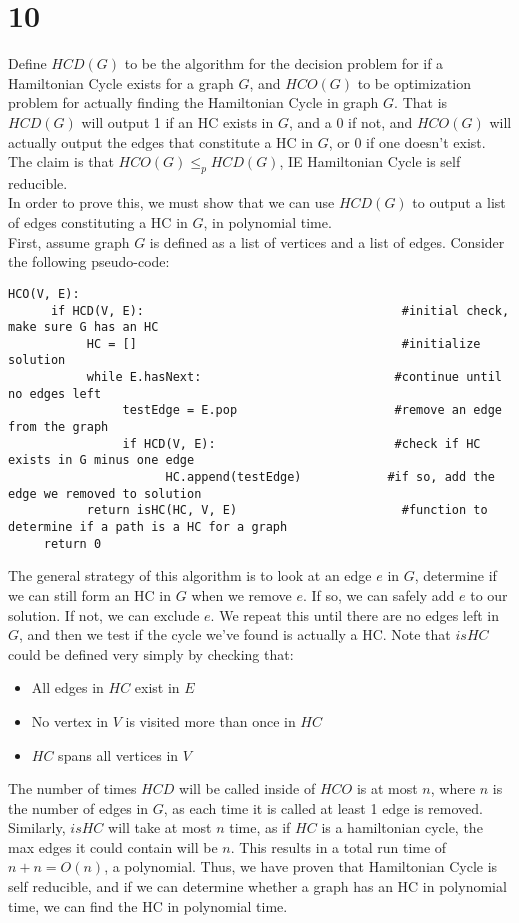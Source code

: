 \documentclass[letterpaper,notitlepage,twoside]{article}
\begin{document}
{\section*{10}
Define $HCD(G)$ to be the algorithm for the decision problem for if a Hamiltonian Cycle exists for a graph $G$, and $HCO(G)$ to be optimization problem for actually finding the Hamiltonian Cycle in graph $G$. That is $HCD(G)$ will output 1 if an HC exists in $G$, and a 0 if not, and $HCO(G)$ will actually output the edges that constitute a HC in $G$, or 0 if one doesn't exist. The claim is that $HCO(G) \leq_p HCD(G)$, IE Hamiltonian Cycle is self reducible. \\
In order to prove this, we must show that we can use $HCD(G)$ to output a list of edges constituting a HC in $G$, in polynomial time. \\
First, assume graph $G$ is defined as a list of vertices and a list of edges. Consider the following pseudo-code: 
\begin{verbatim}
HCO(V, E):
      if HCD(V, E):                                    #initial check, make sure G has an HC
           HC = []                                     #initialize solution 
           while E.hasNext:                           #continue until no edges left 
                testEdge = E.pop                      #remove an edge from the graph
                if HCD(V, E):                         #check if HC exists in G minus one edge
                      HC.append(testEdge)            #if so, add the edge we removed to solution
           return isHC(HC, V, E)                       #function to determine if a path is a HC for a graph
     return 0

\end{verbatim}
The general strategy of this algorithm is to look at an edge $e$ in $G$, determine if we can still form an HC in $G$ when we remove $e$. If so, we can safely add $e$ to our solution. If not, we can exclude $e$. We repeat this until there are no edges left in $G$, and then we test if the cycle we've found is actually a HC. Note that $isHC$ could be defined very simply by checking that:
\begin{itemize}
\item All edges in $HC$ exist in $E$
\item No vertex in $V$ is visited more than once in $HC$
\item $HC$ spans all vertices in $V$
\end{itemize}
The number of times $HCD$ will be called inside of $HCO$ is at most $n$, where $n$ is the number of edges in $G$, as each time it is called at least 1 edge is removed. Similarly, $isHC$ will take at most $n$ time, as if $HC$ is a hamiltonian cycle, the max edges it could contain will be $n$. This results in a total run time of $n + n = O(n)$, a polynomial. Thus, we have proven that Hamiltonian Cycle is self reducible, and if we can determine whether a graph has an HC in polynomial time, we can find the HC in polynomial time.  
}
\end{document}
